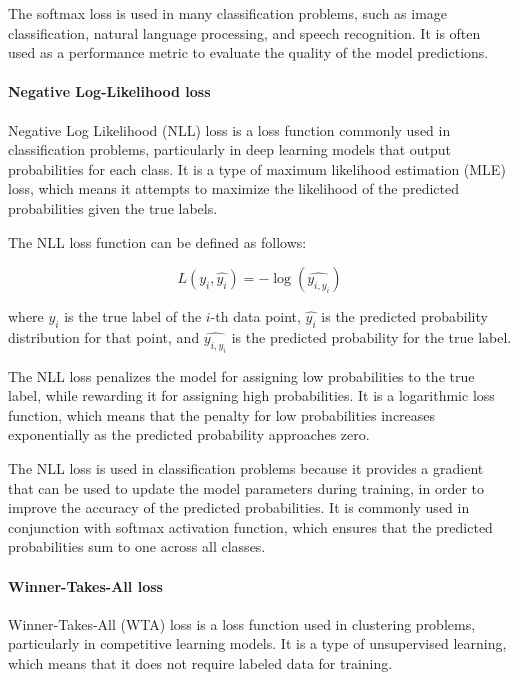 The softmax loss is used in many classification problems, such as image classification, natural language processing, and speech recognition. It is often used as a performance metric to evaluate the quality of the model predictions.

\paragraph{Negative Log-Likelihood loss}
\label{par:3_NLL_loss}

Negative Log Likelihood (NLL) loss is a loss function commonly used in classification problems, particularly in deep learning models that output probabilities for each class. It is a type of maximum likelihood estimation (MLE) loss, which means it attempts to maximize the likelihood of the predicted probabilities given the true labels.

The NLL loss function can be defined as follows:

\begin{equation}
	L(y_i, \hat{y_i}) = -\log(\hat{y_{i,y_i}})
\end{equation}

where $y_i$ is the true label of the $i$-th data point, $\hat{y_i}$ is the predicted probability distribution for that point, and $\hat{y_{i,y_i}}$ is the predicted probability for the true label.

The NLL loss penalizes the model for assigning low probabilities to the true label, while rewarding it for assigning high probabilities. It is a logarithmic loss function, which means that the penalty for low probabilities increases exponentially as the predicted probability approaches zero.

The NLL loss is used in classification problems because it provides a gradient that can be used to update the model parameters during training, in order to improve the accuracy of the predicted probabilities. It is commonly used in conjunction with softmax activation function, which ensures that the predicted probabilities sum to one across all classes.

\paragraph{Winner-Takes-All loss}
\label{par:3_WTA_loss}

Winner-Takes-All (WTA) loss is a loss function used in clustering problems, particularly in competitive learning models. It is a type of unsupervised learning, which means that it does not require labeled data for training.

